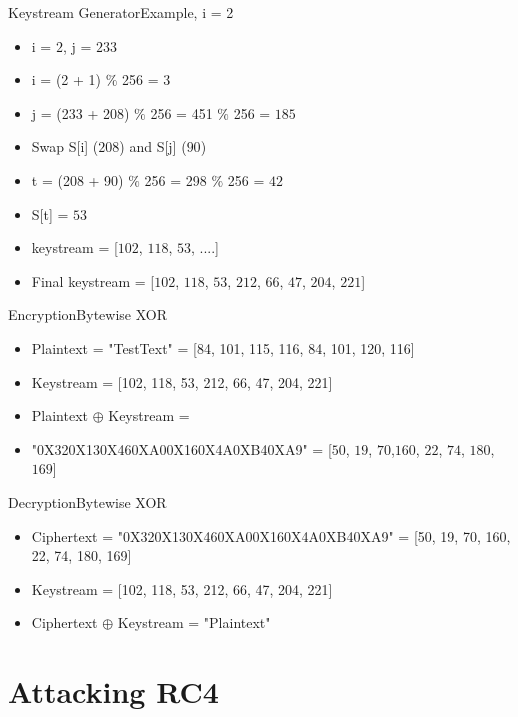 \documentclass[
	aspectratio=169,	%
	onlytextwidth,		%
	t,					%
	]{beamer}
\begin{document}
\begin{frame}[fragile]{Keystream Generator}{Example, i = 2}
	\begin{itemize}
		\item i = $2$, j = $233$
		\item i = (2 + 1) $\%$ 256 = $3$
		\item j = (233 + 208) $\%$ 256 = 451 $\%$ 256 = $185$
		\item Swap S[i] ($208$) and S[j] ($90$)
		\item t = (208 + 90) $\%$ 256 = 298 $\%$ 256 = $42$
		\item S[t] = $53$
		\item keystream = [$102$, $118$, $53$, ....]
		\item Final keystream = [$102$, $118$, $53$, $212$, $66$, $47$, $204$, $221$]
	\end{itemize}
\end{frame}

\begin{frame}[fragile]{Encryption}{Bytewise XOR}
	\small
	\begin{itemize}
		\item Plaintext = "TestText" = {\color{purple}[84, 101, 115, 116, 84, 101, 120, 116]}
		\item Keystream = {\color{olive}[102, 118, 53, 212, 66, 47, 204, 221]}
		\item Plaintext $\oplus$ Keystream =
		\item "0X320X130X460XA00X160X4A0XB40XA9" = [$50$, $19$, $70$,$160$, $22$, $74$, $180$, $169$]
	\end{itemize}
	\normalsize
\end{frame}

\begin{frame}[fragile]{Decryption}{Bytewise XOR}
	\small
	\begin{itemize}
		\item Ciphertext = "0X320X130X460XA00X160X4A0XB40XA9" = {\color{purple}[50, 19, 70, 160, 22, 74, 180, 169]}
		\item Keystream = {\color{olive}[102, 118, 53, 212, 66, 47, 204, 221]} 
		\item Ciphertext $\oplus$ Keystream = "Plaintext"
	\end{itemize}
	\normalsize
\end{frame}

\section{Attacking RC4}
\end{document}
